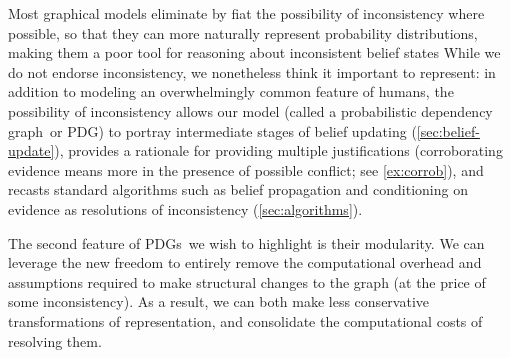 \documentclass{article}
\newcommand\changed[1]{{\color{note-fg} #1}}
\newcommand{\modelname}{probabilistic dependency graph}
\newcommand{\MN}{PDG}
\newcommand{\MNs}{\MN s}
\begin{document}
		
	\changed{Most graphical models eliminate by fiat the possibility of inconsistency where possible, so that they can more naturally represent probability distributions, making them a poor tool for reasoning about inconsistent belief states
	While we do not endorse inconsistency}, we nonetheless think it important to represent: in addition to modeling an overwhelmingly common feature of humans, the possibility of inconsistency 
	\changed{allows our model (called a \modelname\ or \MN)
	to portray} intermediate stages of belief updating (\cref{sec:belief-update}), 
	provides a rationale for providing multiple justifications 
	(corroborating evidence means more \changed{in the presence of possible conflict}; see \cref{ex:corrob}),
	and	\changed{recasts} standard algorithms such as belief propagation and conditioning on evidence as resolutions of inconsistency (\cref{sec:algorithms}). 
	
		
	
	
	
	\changed{The second feature of \MNs\ we wish to highlight is their modularity. We can leverage the new freedom to entirely remove the computational overhead and assumptions required to make structural changes to the graph (at the price of some inconsistency). 
	As a result, we can both make less conservative transformations of representation, and consolidate the computational costs of resolving them.}
\end{document}
